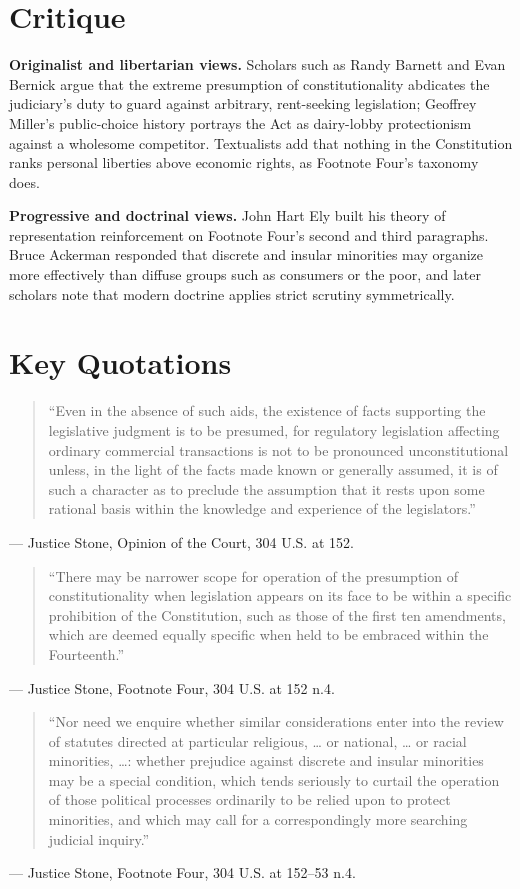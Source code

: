 \documentclass[12pt]{article}
\begin{document}
\section{Critique}

\textbf{Originalist and libertarian views.} Scholars such as Randy Barnett and Evan Bernick argue that the extreme presumption of constitutionality abdicates the judiciary's duty to guard against arbitrary, rent-seeking legislation; Geoffrey Miller's public-choice history portrays the Act as dairy-lobby protectionism against a wholesome competitor. Textualists add that nothing in the Constitution ranks personal liberties above economic rights, as Footnote Four's taxonomy does.

\textbf{Progressive and doctrinal views.} John Hart Ely built his theory of representation reinforcement on Footnote Four's second and third paragraphs. Bruce Ackerman responded that discrete and insular minorities may organize more effectively than diffuse groups such as consumers or the poor, and later scholars note that modern doctrine applies strict scrutiny symmetrically.

\section{Key Quotations}

\begin{quote}
``Even in the absence of such aids, the existence of facts supporting the legislative judgment is to be presumed, for regulatory legislation affecting ordinary commercial transactions is not to be pronounced unconstitutional unless, in the light of the facts made known or generally assumed, it is of such a character as to preclude the assumption that it rests upon some rational basis within the knowledge and experience of the legislators.''
\end{quote}
\noindent --- Justice Stone, Opinion of the Court, 304 U.S. at 152.

\begin{quote}
``There may be narrower scope for operation of the presumption of constitutionality when legislation appears on its face to be within a specific prohibition of the Constitution, such as those of the first ten amendments, which are deemed equally specific when held to be embraced within the Fourteenth.''
\end{quote}
\noindent --- Justice Stone, Footnote Four, 304 U.S. at 152 n.4.

\begin{quote}
``Nor need we enquire whether similar considerations enter into the review of statutes directed at particular religious, \dots{} or national, \dots{} or racial minorities, \dots{}: whether prejudice against discrete and insular minorities may be a special condition, which tends seriously to curtail the operation of those political processes ordinarily to be relied upon to protect minorities, and which may call for a correspondingly more searching judicial inquiry.''
\end{quote}
\noindent --- Justice Stone, Footnote Four, 304 U.S. at 152--53 n.4.
\end{document}
